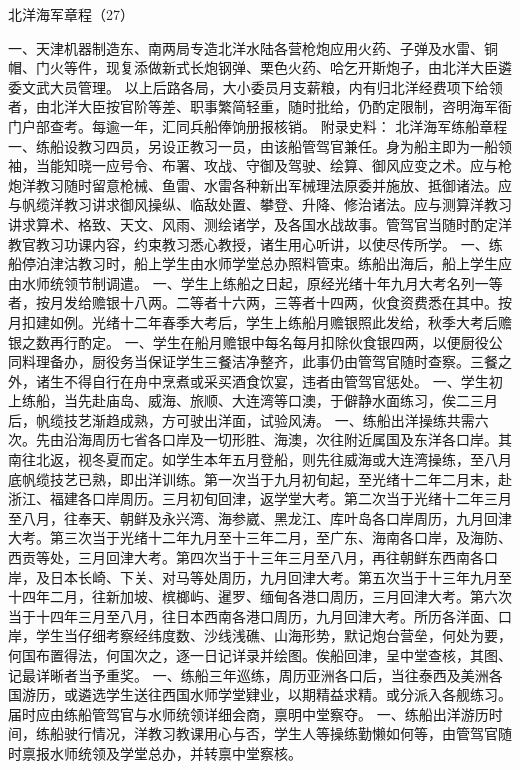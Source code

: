 \documentclass[12pt,UTF8]{ctexbook}
\begin{document}
北洋海军章程（27）

一、天津机器制造东、南两局专造北洋水陆各营枪炮应用火药、子弹及水雷、铜帽、门火等件，现复添做新式长炮钢弹、栗色火药、哈乞开斯炮子，由北洋大臣遴委文武大员管理。
以上后路各局，大小委员月支薪粮，内有归北洋经费项下给领者，由北洋大臣按官阶等差、职事繁简轻重，随时批给，仍酌定限制，咨明海军衙门户部查考。每逾一年，汇同兵船俸饷册报核销。
附录史料：
北洋海军练船章程
一、练船设教习四员，另设正教习一员，由该船管驾官兼任。身为船主即为一船领袖，当能知晓一应号令、布署、攻战、守御及驾驶、绘算、御风应变之术。应与枪炮洋教习随时留意枪械、鱼雷、水雷各种新出军械理法原委并施放、抵御诸法。应与帆缆洋教习讲求御风操纵、临敌处置、攀登、升降、修治诸法。应与测算洋教习讲求算术、格致、天文、风雨、测绘诸学，及各国水战故事。管驾官当随时酌定洋教官教习功课内容，约束教习悉心教授，诸生用心听讲，以使尽传所学。
一、练船停泊津沽教习时，船上学生由水师学堂总办照料管束。练船出海后，船上学生应由水师统领节制调遣。
一、学生上练船之日起，原经光绪十年九月大考名列一等者，按月发给赡银十八两。二等者十六两，三等者十四两，伙食资费悉在其中。按月扣建如例。光绪十二年春季大考后，学生上练船月赡银照此发给，秋季大考后赡银之数再行酌定。
一、学生在船月赡银中每名每月扣除伙食银四两，以便厨役公同料理备办，厨役务当保证学生三餐洁净整齐，此事仍由管驾官随时查察。三餐之外，诸生不得自行在舟中烹煮或采买酒食饮宴，违者由管驾官惩处。
一、学生初上练船，当先赴庙岛、威海、旅顺、大连湾等口澳，于僻静水面练习，俟二三月后，帆缆技艺渐趋成熟，方可驶出洋面，试验风涛。
一、练船出洋操练共需六次。先由沿海周历七省各口岸及一切形胜、海澳，次往附近属国及东洋各口岸。其南往北返，视冬夏而定。如学生本年五月登船，则先往威海或大连湾操练，至八月底帆缆技艺已熟，即出洋训练。第一次当于九月初旬起，至光绪十二年二月末，赴浙江、福建各口岸周历。三月初旬回津，返学堂大考。第二次当于光绪十二年三月至八月，往奉天、朝鲜及永兴湾、海参崴、黑龙江、库叶岛各口岸周历，九月回津大考。第三次当于光绪十二年九月至十三年二月，至广东、海南各口岸，及海防、西贡等处，三月回津大考。第四次当于十三年三月至八月，再往朝鲜东西南各口岸，及日本长崎、下关、对马等处周历，九月回津大考。第五次当于十三年九月至十四年二月，往新加坡、槟榔屿、暹罗、缅甸各港口周历，三月回津大考。第六次当于十四年三月至八月，往日本西南各港口周历，九月回津大考。所历各洋面、口岸，学生当仔细考察经纬度数、沙线浅礁、山海形势，默记炮台营垒，何处为要，何国布置得法，何国次之，逐一日记详录并绘图。俟船回津，呈中堂查核，其图、记最详晰者当予重奖。
一、练船三年巡练，周历亚洲各口后，当往泰西及美洲各国游历，或遴选学生送往西国水师学堂肄业，以期精益求精。或分派入各舰练习。届时应由练船管驾官与水师统领详细会商，禀明中堂察夺。
一、练船出洋游历时间，练船驶行情况，洋教习教课用心与否，学生人等操练勤懒如何等，由管驾官随时禀报水师统领及学堂总办，并转禀中堂察核。
\end{document}
